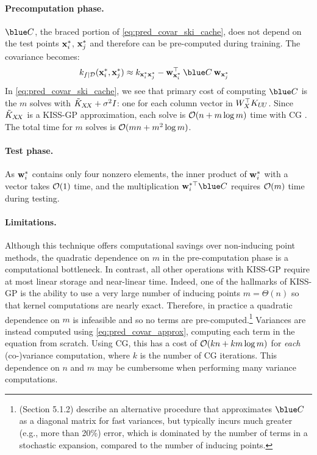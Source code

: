 \paragraph{Precomputation phase.}
$\blue C$, the braced portion of \eqref{eq:pred_covar_ski_cache}, does not depend on the test points $\mathbf{x}^*_{i}$, $\mathbf{x}^*_{j}$ and therefore can be pre-computed during training.
The covariance becomes:
%
\begin{align}
  k_{f\mid\dset}(\bxtest_i, \bxtest_j) &\approx k_{\bxtest_i \bxtest_j} - \bw_{\bxtest_i}^\top \: \blue C \: \bw_{\bxtest_j}
    \label{eq:pred_covar_ski_naive}
\end{align}
%
In \eqref{eq:pred_covar_ski_cache}, we see that primary cost of computing $\blue C$ is the $m$ solves with $\tilde{K}_{X\!X} + \sigma^2 I$: one for each column vector in $W^{\top}_{X} K_{U \! U}$.
Since $\tilde {K}_{X\!X}$ is a KISS-GP approximation, each solve is $\bigo{n + m\log m}$ time with CG \cite{wilson2015kernel}.
The total time for $m$ solves is $\bigo{mn + m^2 \log m}$.

\paragraph{Test phase.}
As $\mathbf{w}^{*}_{i}$ contains only four nonzero elements,
the inner product of $\mathbf{w}^{*}_{i}$ with a vector takes $\bigo{1}$ time,
and the multiplication $\bw^{*\top}_{i}\blue C$ requires $\bigo{m}$ time during testing.

\paragraph{Limitations.}
Although this technique offers computational savings over non-inducing point methods, the quadratic dependence on $m$ in the pre-computation phase is a computational bottleneck.
In contrast, all other operations with KISS-GP require at most linear storage and near-linear time.
Indeed, one of the hallmarks of KISS-GP is the ability to use a very large number of inducing points $m = \Theta(n)$ so that kernel computations are nearly exact.
Therefore, in practice a quadratic dependence on $m$ is infeasible and so no terms are pre-computed.\footnote{
  \citet{wilson2015thoughts} (Section 5.1.2) describe an alternative procedure that approximates $\blue C$ as a diagonal matrix
  for fast variances, but typically incurs much greater (e.g., more than 20\%) error, which is dominated by the number of terms in
  a stochastic expansion, compared to the number of inducing points.}
Variances are instead computed using \eqref{eq:pred_covar_approx}, computing each term in the equation from scratch.
Using CG, this has a cost of $\bigo{k n + k m \log m}$ for \emph{each} (co-)variance computation, where $k$ is the number of CG iterations.
This dependence on $n$ and $m$ may be cumbersome when performing many variance computations.

